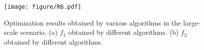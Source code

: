 \documentclass[10pt,journal,compsoc]{IEEEtran}
\begin{document}
\begin{figure}[t] 
    \centering  %
    \texttt{[image: figure/R6.pdf]}  %
    \caption{Optimization results obtained by various algorithms in the large-scale scenario. (a) $f_1$ obtained by different algorithms. (b) $f_2$ obtained by different algorithms.}  %
    \label{zhuxingtu_16}
\end{figure}

			

			
\end{document}
